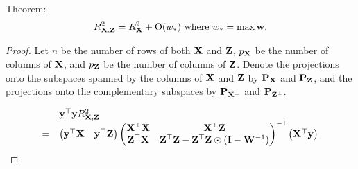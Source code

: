 \documentclass{amsart}[12pt]
\theoremstyle{definition}
\begin{document}
Theorem:
\[
	R^2_{{\bf X}, {\bf Z}} = R^2_{{\bf X}} + \text{O}(w_*) \text{ where } w_* = \max{{\bf w}}.
\]

\begin{proof}
	Let $n$ be the number of rows of both ${\bf X}$ and ${\bf Z}$, $p_{\bf X}$ be the number of columns of ${\bf X}$, and $p_{\bf Z}$
	be the number of columns of ${\bf Z}$. Denote the projections onto the subspaces spanned by the columns of ${\bf X}$
	and ${\bf Z}$ by ${\bf P}_{\bf X}$ and ${\bf P}_{\bf Z}$, and the projections onto the complementary subspaces by
	${\bf P}_{{\bf X}^\perp}$ and ${\bf P}_{{\bf Z}^\perp}$.
		
	\small
	\begin{equation*}
		\begin{array}{ll}
			                                                                       & {\bf y}^\top {\bf y} R^2_{{\bf X}, {\bf Z}}                                                                                                                                                                             \\
			=                                                                      &                                                                                                                                                                                                         
			\begin{pmatrix}
			{\bf y}^\top {\bf X}                                                           & {\bf y}^\top {\bf Z}                                                                                                                                                                                            
			\end{pmatrix}
			\begin{pmatrix}
			{\bf X}^\top {\bf X}                                                           & {\bf X}^\top {\bf Z}                                                                                                                                                                                            \\
			{\bf Z}^\top {\bf X}                                                           & {\bf Z}^\top {\bf Z} - {\bf Z}^\top {\bf Z} \odot ({\bf I} - {\bf W}^{-1})                                                                                                                                                      
			\end{pmatrix}^{-1}
			\begin{pmatrix}
			{\bf X}^\top {\bf y}\\

\end{pmatrix}
\end{array}
\end{equation*}
\end{proof}
\end{document}
